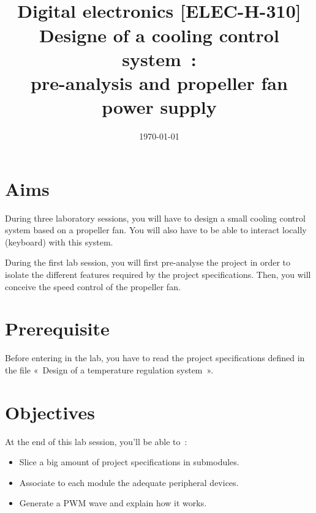 \documentclass[11pt,a4paper]{article}
\date{\vspace{-1.7cm}\mydate\today}
\title{\vspace{-2cm}\labonumber \\ Digital electronics [ELEC-H-310]\\Designe of a cooling control system~: \\ pre-analysis and propeller fan power supply\ifthenelse{\boolean{corrige}}{~\\Corrigé}{}}
\theoremstyle{definition}%
\begin{document}
\pagestyle{empty}
\maketitle





\section*{Aims}
During three laboratory sessions, you will have to design a small cooling control system based on a propeller fan.
You will also have to be able to interact locally (keyboard) with this system.

During the first lab session, you will first pre-analyse the project in order to isolate the different features required by the project specifications.
Then, you will conceive the speed control of the propeller fan.

\section*{Prerequisite}
Before entering in the lab, you have to read the project specifications defined in the file «~Design of a temperature regulation system~».


\section*{Objectives}
At the end of this lab session, you'll be able to~:
\begin{itemize}
	\item Slice a big amount of project specifications in submodules.
	\item Associate to each module the adequate peripheral devices.
	\item Generate a PWM wave and explain how it works.
\end{itemize}


\newpage


\end{document}
